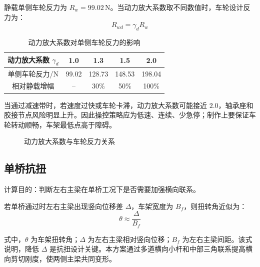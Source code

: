\documentclass[UTF8,a4paper,12pt,fontset=none]{ctexart}
\numberwithin{equation}{section}
\numberwithin{figure}{section}
\numberwithin{table}{section}
\newcommand{\Nunit}{\,\mathrm{N}}
\begin{document}
静载单侧车轮反力为 $R_w=99.02\Nunit$。当动力放大系数取不同数值时，车轮设计反力为：
\begin{equation}
  R_{wd}=\gamma_d R_w
\end{equation}

\begin{table}[H]
\centering
\caption{动力放大系数对单侧车轮反力的影响}
\label{tab:dynamic-reaction}
\begin{tabular}{c c c c c}
\toprule
\textbf{动力放大系数 $\gamma_d$} & \textbf{1.0} & \textbf{1.3} & \textbf{1.5} & \textbf{2.0} \\\midrule
单侧车轮反力/N & 99.02 & 128.73 & 148.53 & 198.04 \\
相对静载增幅 & -- & 30\% & 50\% & 100\% \\
\bottomrule
\end{tabular}
\end{table}

当通过减速带时，若速度过快或车轮卡滞，动力放大系数可能接近 $2.0$，轴承座和胶接节点风险明显上升。因此操控策略应为低速、连续、少急停；制作上要保证车轮转动顺畅，车架最低点高于障碍。

\begin{figure}[H]
\centering
{}
\caption{动力放大系数与车轮反力关系}
\label{fig:dynamic-reaction}
\end{figure}

\subsection{单桥抗扭}
计算目的：判断左右主梁在单桥工况下是否需要加强横向联系。

若单桥通过时左右主梁出现竖向位移差 $\Delta$，车架宽度为 $B_f$，则扭转角近似为：
\begin{equation}
  \theta\approx\frac{\Delta}{B_f}
\end{equation}

式中，$\theta$ 为车架扭转角；$\Delta$ 为左右主梁相对竖向位移；$B_f$ 为左右主梁间距。该式说明，降低 $\Delta$ 是抗扭设计关键。本方案通过多道横向小杆和中部三角联系提高横向剪切刚度，使两侧主梁共同变形。
\end{document}
